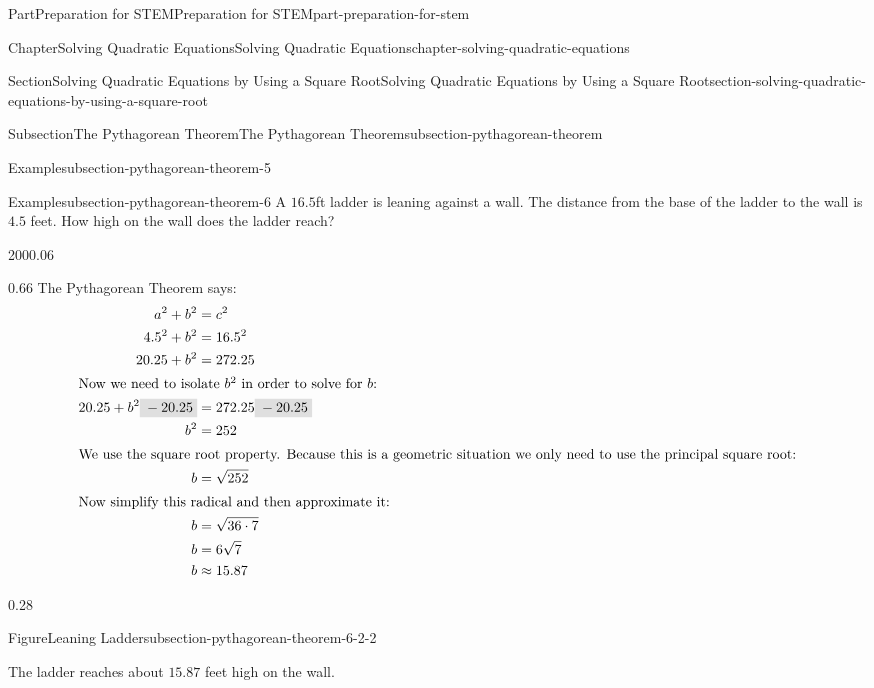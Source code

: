 \documentclass[twoside,10pt,]{book}
\numberwithin{equation}{section}
\newcommand{\highlight}[1]{\mathchoice{\colorbox{lightsapphire}{$\displaystyle #1$}}{\colorbox{lightsapphire}{$\textstyle #1$}}{\colorbox{lightsapphire}{$\scriptstyle #1$}}{\colorbox{lightsapphire}{$\scriptscriptstyle #1$}}}
\newcommand{\subtractright}[1]{{\highlight{{{}-#1}}}}
\newcommand{\amp}{&}
\begin{document}
\begin{partptx}{Part}{Preparation for STEM}{}{Preparation for STEM}{}{}{part-preparation-for-stem}
\begin{chapterptx}{Chapter}{Solving Quadratic Equations}{}{Solving Quadratic Equations}{}{}{chapter-solving-quadratic-equations}
\begin{sectionptx}{Section}{Solving Quadratic Equations by Using a Square Root}{}{Solving Quadratic Equations by Using a Square Root}{}{}{section-solving-quadratic-equations-by-using-a-square-root}
\begin{subsectionptx}{Subsection}{The Pythagorean Theorem}{}{The Pythagorean Theorem}{}{}{subsection-pythagorean-theorem}
\begin{example}{Example}{}{subsection-pythagorean-theorem-5}
\end{example}
\begin{example}{Example}{}{subsection-pythagorean-theorem-6}%
A \(16.5\)ft ladder is leaning against a wall. The distance from the base of the ladder to the wall is \(4.5\) feet. How high on the wall does the ladder reach?%
\begin{sidebyside}{2}{0}{0}{0.06}%
\begin{sbspanel}{0.66}%
The Pythagorean Theorem says:%
\begin{align*}
a^2+b^2\amp=c^2\\
4.5^2+b^2\amp=16.5^2\\
20.25+b^2\amp=272.25\\
\intertext{Now we need to isolate \(b^2\) in order to solve for \(b\):}
20.25+b^2\subtractright{20.25}\amp=272.25\subtractright{20.25}\\
b^2\amp=252\\
\intertext{We use the square root property. Because this is a geometric situation we only need to use the principal square root:}
b\amp=\sqrt{252}\\
\intertext{Now simplify this radical and then approximate it:}
b\amp=\sqrt{36\cdot 7}\\
b\amp=6\sqrt{7}\\
b\amp\approx 15.87
\end{align*}
%
\end{sbspanel}%
\begin{sbspanel}{0.28}%
\begin{panelfigureptx}{Figure}{Leaning Ladder}{subsection-pythagorean-theorem-6-2-2}{}%
%
\tcblower
\end{panelfigureptx}%
\end{sbspanel}%
\end{sidebyside}%
\par
The ladder reaches about \(15.87\) feet high on the wall.%
\end{example}
\end{subsectionptx}
%
%
\typeout{************************************************}
\typeout{************************************************}

\end{sectionptx}
\end{chapterptx}
\end{partptx}
\end{document}
